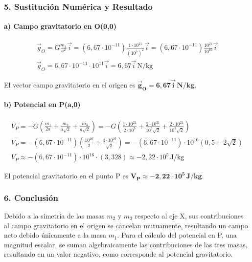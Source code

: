 \subsubsection*{5. Sustitución Numérica y Resultado}
\paragraph{a) Campo gravitatorio en O(0,0)}
\begin{gather}
    \vec{g}_O = G\frac{m_1}{a^2}\vec{i} = (6,67 \cdot 10^{-11})\frac{1 \cdot 10^{21}}{(10^5)^2}\vec{i} = (6,67 \cdot 10^{-11})\frac{10^{21}}{10^{10}}\vec{i} \nonumber \\
    \vec{g}_O = 6,67 \cdot 10^{-11} \cdot 10^{11} \vec{i} = 6,67\vec{i}\,\text{N/kg}
\end{gather}
\begin{cajaresultado}
El vector campo gravitatorio en el origen es $\boldsymbol{\vec{g}_O = 6,67\vec{i}\,\textbf{N/kg}}$.
\end{cajaresultado}

\paragraph{b) Potencial en P(a,0)}
\begin{gather}
    V_P = -G \left( \frac{m_1}{2a} + \frac{m_2}{a\sqrt{2}} + \frac{m_3}{a\sqrt{2}} \right) = -G \left( \frac{1 \cdot 10^{21}}{2 \cdot 10^5} + \frac{2 \cdot 10^{21}}{10^5\sqrt{2}} + \frac{2 \cdot 10^{21}}{10^5\sqrt{2}} \right) \nonumber \\
    V_P = -(6,67 \cdot 10^{-11}) \left( \frac{10^{16}}{2} + \frac{4 \cdot 10^{16}}{\sqrt{2}} \right) = -(6,67 \cdot 10^{-11}) \cdot 10^{16} \left( 0,5 + 2\sqrt{2} \right) \nonumber \\
    V_P \approx -(6,67 \cdot 10^{-11}) \cdot 10^{16} \cdot (3,328) \approx -2,22 \cdot 10^5\,\text{J/kg}
\end{gather}
\begin{cajaresultado}
El potencial gravitatorio en el punto P es $\boldsymbol{V_P \approx -2,22 \cdot 10^5\,\textbf{J/kg}}$.
\end{cajaresultado}

\subsubsection*{6. Conclusión}
\begin{cajaconclusion}
Debido a la simetría de las masas $m_2$ y $m_3$ respecto al eje X, sus contribuciones al campo gravitatorio en el origen se cancelan mutuamente, resultando un campo neto debido únicamente a la masa $m_1$. Para el cálculo del potencial en P, una magnitud escalar, se suman algebraicamente las contribuciones de las tres masas, resultando en un valor negativo, como corresponde al potencial gravitatorio.
\end{cajaconclusion}

